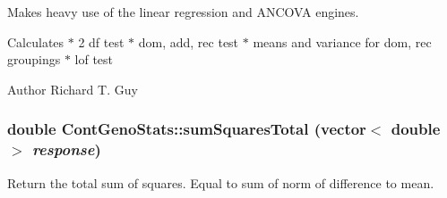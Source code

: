 Makes heavy use of the linear regression and ANCOVA engines.

Calculates $\ast$ 2 df test $\ast$ dom, add, rec test $\ast$ means and variance for dom, rec groupings $\ast$ lof test

\begin{DoxyAuthor}{Author}
Richard T. Guy 
\end{DoxyAuthor}
\hypertarget{classContGenoStats_aac4cebdec0c08a7a713ed31486e84404}{
\subsubsection[{sumSquaresTotal}]{\setlength{\rightskip}{0pt plus 5cm}double ContGenoStats::sumSquaresTotal (vector$<$ double $>$ {\em response})}}
\label{classContGenoStats_aac4cebdec0c08a7a713ed31486e84404}
Return the total sum of squares. Equal to sum of norm of difference to mean. 


